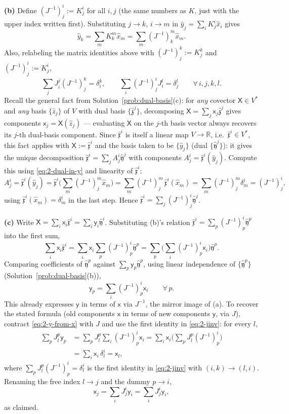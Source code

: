 \documentclass[11pt]{article}
\newcommand{\dual}{V^{*}}
\begin{document}
\textbf{(b)} Define $(J^{-1})^i_j:=K_j^i$ for all $i,j$ (the same numbers as $K$, just with the upper index written first). Substituting $j\to k$, $i\to m$ in $\hat y_j=\sum_iK_j^i\hat x_i$ gives
\[
\hat y_k=\sum_mK_k^m\hat x_m=\sum_m(J^{-1})^m_k\hat x_m. \tag{2.1}\label{eq:2-dual-in-y}
\]
Also, relabeling the matrix identities above with $(J^{-1})^k_j:=K_j^k$ and $(J^{-1})^i_j:=K_j^i$,
\[
\sum_jJ_i^j(J^{-1})^k_j=\delta_i^k, \qquad \sum_i(J^{-1})^i_jJ_i^l=\delta_j^l \qquad \forall\, i,j,k,l. \tag{2.2}\label{eq:2-jinv}
\]
Recall the general fact from Solution~\ref{prob:dual-basis}(c): for \emph{any} covector $\mathsf X\in\dual$ and \emph{any} basis $\{\hat z_j\}$ of $V$ with dual basis $\{\hat{\mathfrak z}^j\}$, decomposing $\mathsf X=\sum_j\mathsf x_j\hat{\mathfrak z}^j$ gives components $\mathsf x_j=\mathsf X(\hat z_j)$ — evaluating $\mathsf X$ on the $j$-th basis vector always recovers its $j$-th dual-basis component. Since $\hat{\mathfrak x}^i$ is itself a linear map $V\to\mathbb R$, i.e.\ $\hat{\mathfrak x}^i\in\dual$, this fact applies with $\mathsf X:=\hat{\mathfrak x}^i$ and the basis taken to be $\{\hat y_j\}$ (dual $\{\hat{\mathfrak y}^j\}$): it gives the unique decomposition $\hat{\mathfrak x}^i=\sum_jA^i_j\hat{\mathfrak y}^j$ with components $A^i_j=\hat{\mathfrak x}^i(\hat y_j)$. Compute this using \eqref{eq:2-dual-in-y} and linearity of $\hat{\mathfrak x}^i$:
\[
A^i_j=\hat{\mathfrak x}^i(\hat y_j)=\hat{\mathfrak x}^i\Big(\sum_m(J^{-1})^m_j\hat x_m\Big)=\sum_m(J^{-1})^m_j\,\hat{\mathfrak x}^i(\hat x_m)=\sum_m(J^{-1})^m_j\delta^i_m=(J^{-1})^i_j,
\]
using $\hat{\mathfrak x}^i(\hat x_m)=\delta^i_m$ in the last step. Hence $\hat{\mathfrak x}^i=\sum_j(J^{-1})^i_j\hat{\mathfrak y}^j$.

\textbf{(c)} Write $\mathsf X=\sum_i\mathsf x_i\hat{\mathfrak x}^i=\sum_i\mathsf y_i\hat{\mathfrak y}^i$. Substituting (b)'s relation $\hat{\mathfrak x}^i=\sum_p(J^{-1})^i_p\hat{\mathfrak y}^p$ into the first sum,
\[
\sum_i\mathsf x_i\hat{\mathfrak x}^i=\sum_i\mathsf x_i\sum_p(J^{-1})^i_p\hat{\mathfrak y}^p=\sum_p\Big(\sum_i(J^{-1})^i_p\mathsf x_i\Big)\hat{\mathfrak y}^p.
\]
Comparing coefficients of $\hat{\mathfrak y}^p$ against $\sum_p\mathsf y_p\hat{\mathfrak y}^p$, using linear independence of $\{\hat{\mathfrak y}^p\}$ (Solution~\ref{prob:dual-basis}(b)),
\[
\mathsf y_p=\sum_i(J^{-1})^i_p\mathsf x_i \qquad \forall\, p. \tag{2.3}\label{eq:2-y-from-x}
\]
This already expresses $\mathsf y$ in terms of $\mathsf x$ via $J^{-1}$, the mirror image of (a). To recover the stated formula (old components $\mathsf x$ in terms of new components $\mathsf y$, via $J$), contract \eqref{eq:2-y-from-x} with $J$ and use the first identity in \eqref{eq:2-jinv}: for every $l$,
\begin{align*}
\sum_pJ_l^p\mathsf y_p &=\sum_pJ_l^p\sum_i(J^{-1})^i_p\mathsf x_i =\sum_i\mathsf x_i\Big(\sum_pJ_l^p(J^{-1})^i_p\Big) \\
&=\sum_i\mathsf x_i\,\delta_l^i=\mathsf x_l,
\end{align*}
where $\sum_pJ_l^p(J^{-1})^i_p=\delta_l^i$ is the first identity in \eqref{eq:2-jinv} with $(i,k)\to(l,i)$. Renaming the free index $l\to j$ and the dummy $p\to i$,
\[
\mathsf x_j=\sum_iJ_j^i\mathsf y_i=\sum_iJ^i_j\mathsf y_i,
\]
as claimed.
\end{document}
